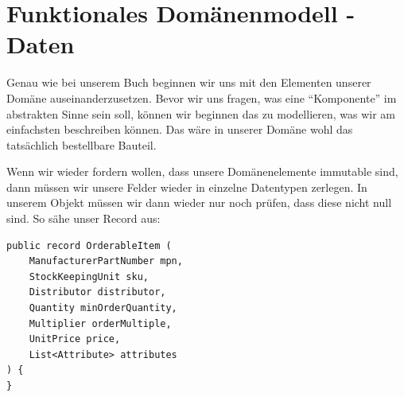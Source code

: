 \section{Funktionales Domänenmodell - Daten}

Genau wie bei unserem Buch beginnen wir uns mit den Elementen unserer Domäne
auseinanderzusetzen. Bevor wir uns fragen, was eine ``Komponente'' im abstrakten
Sinne sein soll, können wir beginnen das zu modellieren, was wir am einfachsten
beschreiben können. Das wäre in unserer Domäne wohl das tatsächlich bestellbare
Bauteil.

Wenn wir wieder fordern wollen, dass unsere Domänenelemente immutable sind,
dann müssen wir unsere Felder wieder in einzelne Datentypen zerlegen. 
In unserem Objekt müssen wir dann wieder nur noch prüfen, dass diese 
nicht null sind. So sähe unser Record aus:

\begin{listing}[H]
\begin{verbatim}
public record OrderableItem (
    ManufacturerPartNumber mpn,
    StockKeepingUnit sku,
    Distributor distributor,
    Quantity minOrderQuantity,
    Multiplier orderMultiple,
    UnitPrice price,
    List<Attribute> attributes
) {
}
\end{verbatim}
\caption{OrderableItem als Record-Typ}
\label{lst:recordOrderItemModel}
\end{listing}

